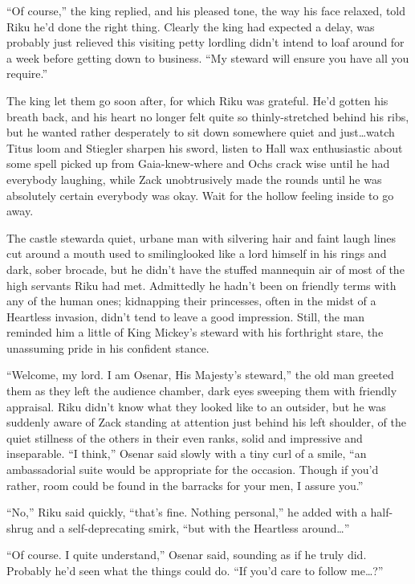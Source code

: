 ``Of course,'' the king replied, and his pleased tone, the way his face relaxed, told Riku he'd done the right thing. Clearly the king had expected a delay, was probably just relieved this visiting petty lordling didn't intend to loaf around for a week before getting down to business. ``My steward will ensure you have all you require.''

The king let them go soon after, for which Riku was grateful. He'd gotten his breath back, and his heart no longer felt quite so thinly-stretched behind his ribs, but he wanted rather desperately to sit down somewhere quiet and just\ldots watch Titus loom and Stiegler sharpen his sword, listen to Hall wax enthusiastic about some spell picked up from Gaia-knew-where and Ochs crack wise until he had everybody laughing, while Zack unobtrusively made the rounds until he was absolutely certain everybody was okay. Wait for the hollow feeling inside to go away.

The castle steward\textemdash a quiet, urbane man with silvering hair and faint laugh lines cut around a mouth used to smiling\textemdash looked like a lord himself in his rings and dark, sober brocade, but he didn't have the stuffed mannequin air of most of the high servants Riku had met. Admittedly he hadn't been on friendly terms with any of the human ones; kidnapping their princesses, often in the midst of a Heartless invasion, didn't tend to leave a good impression. Still, the man reminded him a little of King Mickey's steward with his forthright stare, the unassuming pride in his confident stance.

``Welcome, my lord. I am Osenar, His Majesty's steward,'' the old man greeted them as they left the audience chamber, dark eyes sweeping them with friendly appraisal. Riku didn't know what they looked like to an outsider, but he was suddenly aware of Zack standing at attention just behind his left shoulder, of the quiet stillness of the others in their even ranks, solid and impressive and inseparable. ``I think,'' Osenar said slowly with a tiny curl of a smile, ``an ambassadorial suite would be appropriate for the occasion. Though if you'd rather, room could be found in the barracks for your men, I assure you.''

``No,'' Riku said quickly, ``that's fine. Nothing personal,'' he added with a half-shrug and a self-deprecating smirk, ``but with the Heartless around\ldots ''

``Of course. I quite understand,'' Osenar said, sounding as if he truly did. Probably he'd seen what the things could do. ``If you'd care to follow me\ldots ?''

